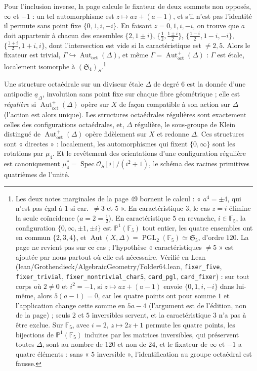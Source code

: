 \documentclass[11pt,a4paper]{article}
\begin{document}
Pour l'inclusion inverse, la page calcule le fixateur de deux sommets non
opposés, $\infty$ et $-1$ : un tel automorphisme est $z \mapsto az + (a - 1)$,
et s'il n'est pas l'identité il permute sans point fixe $\{0, 1, i, -i\}$. En
faisant $z = 0, 1, i, -i$, on trouve que $a$ doit appartenir à chacun des
ensembles $\{2, 1 \pm i\}$, $\{\tfrac12, \tfrac{1 \pm i}{2}\}$,
$\{\tfrac{1-i}{2}, 1 - i, -i\}$, $\{\tfrac{1+i}{2}, 1 + i, i\}$, dont
l'intersection est vide si la caractéristique est $\neq 2, 5$. Alors le
fixateur est trivial, $\Gamma \hookrightarrow
\operatorname{Aut}_{\mathrm{oct}}(\Delta)$, et même $\Gamma =
\operatorname{Aut}^{+}_{\mathrm{oct}}(\Delta)$ : $\Gamma$ est étale,
localement isomorphe à $(\mathfrak{S}_4)_S$.\footnote{Les deux notes marginales
de la page 49 bornent le calcul : « $a^4 = \pm 4$, qui n'est pas égal à $1$ si
car.\ $\neq 3$ et $5$ ». En caractéristique $3$, le cas $z = i$ élimine la seule
coïncidence ($a = 2 = \tfrac12$). En caractéristique $5$ en revanche, $i \in
\mathbb{F}_5$, la configuration $\{0, \infty, \pm 1, \pm i\}$ est
$\mathbb{P}^1(\mathbb{F}_5)$ tout entier, les quatre ensembles ont en commun
$\{2, 3, 4\}$, et $\underline{\operatorname{Aut}}(X, \Delta) =
\operatorname{PGL}_2(\mathbb{F}_5) \simeq \mathfrak{S}_5$, d'ordre $120$. La
page ne revient pas sur ce cas ; l'hypothèse « caractéristiques $\neq 5$ » est
ajoutée par nous partout où elle est nécessaire. Vérifié en Lean
(lean/Grothendieck/AlgebraicGeometry/Folder64.lean, \texttt{fixer\_five},
\texttt{fixer\_trivial}, \texttt{fixer\_nontrivial\_char5},
\texttt{card\_pgl}, \texttt{card\_fixer}) : sur tout corps où $2 \neq 0$ et
$i^2 = -1$, si $z \mapsto az + (a - 1)$ envoie $\{0, 1, i, -i\}$ dans
lui-même, alors $5(a - 1) = 0$, car les quatre points ont pour somme $1$ et
l'application change cette somme en $5a - 4$ (l'argument est de l'édition, non
de la page) ; seuls $2$ et $5$ inversibles servent, et la caractéristique $3$
n'a pas à être exclue. Sur $\mathbb{F}_5$, avec $i = 2$, $z \mapsto 2z + 1$
permute les quatre points, les bijections de $\mathbb{P}^1(\mathbb{F}_5)$
induites par les matrices inversibles, qui préservent toutes $\Delta$, sont au
nombre de $120$ et non de $24$, et le fixateur de $\infty$ et $-1$ a quatre
éléments : sans « $5$ inversible », l'identification au groupe octaédral est
fausse.}

Une structure octaédrale sur un diviseur étale $\Delta$ de degré $6$ est la
donnée d'une antipodie $\underline{a}_\Delta$, involution sans point fixe sur
chaque fibre géométrique ; elle est \emph{régulière} si
$\underline{\operatorname{Aut}}^{+}_{\mathrm{oct}}(\Delta)$ opère sur $X$ de
façon compatible à son action sur $\Delta$ (l'action est alors unique). Les
structures octaédrales régulières sont exactement celles des configurations
octaédrales, et, $\Delta$ régulière, le sous-groupe de Klein distingué de
$\operatorname{Aut}^{+}_{\mathrm{oct}}(\Delta)$ opère fidèlement sur $X$ et
redonne $\Delta$. Ces structures sont « directes » : localement, les
automorphismes qui fixent $\{0, \infty\}$ sont les rotations par $\mu_4$. Et le
revêtement des orientations d'une configuration régulière est canoniquement
$\mu_4^{*} = \operatorname{Spec} \mathcal{O}_S[i]/(i^2 + 1)$, le schéma des
racines primitives quatrièmes de l'unité.
\end{document}
